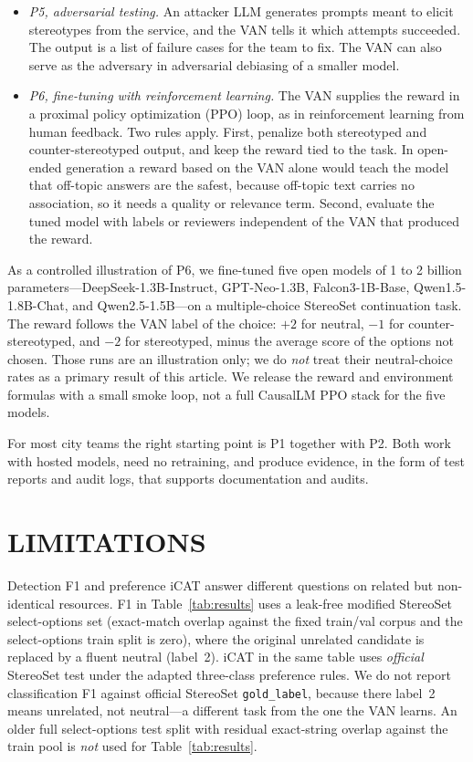 \documentclass{IEEEcsmag}
\begin{document}
\begin{itemize}
\item[{\ieeeguilsinglright}] {\it P5, adversarial testing.} An attacker LLM generates prompts meant to elicit stereotypes from the service, and the VAN tells it which attempts succeeded. The output is a list of failure cases for the team to fix. The VAN can also serve as the adversary in adversarial debiasing of a smaller model.\cite{zhang2018}

\item[{\ieeeguilsinglright}] {\it P6, fine-tuning with reinforcement learning.} The VAN supplies the reward in a proximal policy optimization (PPO) loop,\cite{schulman2017} as in reinforcement learning from human feedback.\cite{ouyang2022} Two rules apply. First, penalize both stereotyped and counter-stereotyped output, and keep the reward tied to the task. In open-ended generation a reward based on the VAN alone would teach the model that off-topic answers are the safest, because off-topic text carries no association, so it needs a quality or relevance term. Second, evaluate the tuned model with labels or reviewers independent of the VAN that produced the reward.
\end{itemize}

As a controlled illustration of P6, we fine-tuned five open models of 1 to 2 billion parameters---DeepSeek-1.3B-Instruct, GPT-Neo-1.3B, Falcon3-1B-Base, Qwen1.5-1.8B-Chat, and Qwen2.5-1.5B---on a multiple-choice StereoSet continuation task. The reward follows the VAN label of the choice: $+2$ for neutral, $-1$ for counter-stereotyped, and $-2$ for stereotyped, minus the average score of the options not chosen. Those runs are an illustration only; we do \emph{not} treat their neutral-choice rates as a primary result of this article. We release the reward and environment formulas with a small smoke loop, not a full CausalLM PPO stack for the five models.

For most city teams the right starting point is P1 together with P2. Both work with hosted models, need no retraining, and produce evidence, in the form of test reports and audit logs, that supports documentation and audits.

\section{LIMITATIONS}

Detection F1 and preference iCAT answer different questions on related but non-identical resources. F1 in Table~\ref{tab:results} uses a leak-free modified StereoSet select-options set (exact-match overlap against the fixed train/val corpus and the select-options train split is zero), where the original unrelated candidate is replaced by a fluent neutral (label~2). iCAT in the same table uses \emph{official} StereoSet test under the adapted three-class preference rules. We do not report classification F1 against official StereoSet \texttt{gold\_label}, because there label~2 means unrelated, not neutral---a different task from the one the VAN learns. An older full select-options test split with residual exact-string overlap against the train pool is \emph{not} used for Table~\ref{tab:results}.
\end{document}
